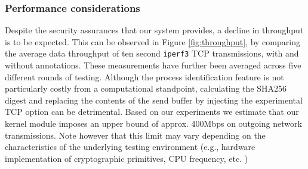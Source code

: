 \subsubsection{Performance considerations}
\label{sign:windows:evaluation:performance}

Despite the security assurances that our system provides, a decline in throughput is to be expected. This can be observed in Figure \ref{fig:throughput}, by comparing the average data throughput of ten second \texttt{iperf3} TCP transmissions, with and without annotations. These measurements have further been averaged across five different rounds of testing. Although the process identification feature is not particularly costly from a computational standpoint, calculating the SHA256 digest and replacing the contents of the send buffer by injecting the experimental TCP option can be detrimental. Based on our experiments we estimate that our kernel module imposes an upper bound of approx. 400Mbps on outgoing network transmissions. Note however that this limit may vary depending on the characteristics of the underlying testing environment (e.g., hardware implementation of cryptographic primitives, CPU frequency, etc. )



